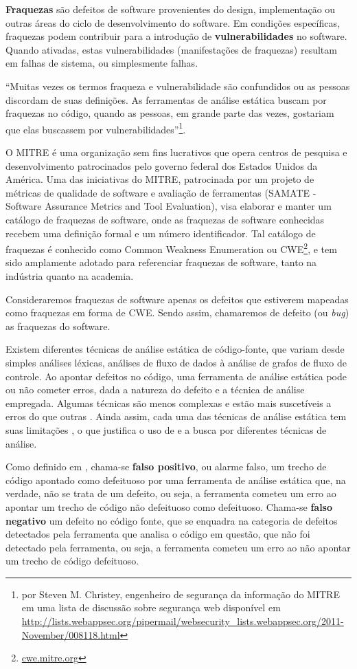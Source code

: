 \textbf{Fraquezas} são defeitos de software provenientes do design, implementação ou outras áreas do ciclo de desenvolvimento do software. Em condições específicas, fraquezas podem contribuir para a introdução de \textbf{vulnerabilidades} no software. Quando ativadas, estas vulnerabilidades (manifestações de fraquezas) resultam em falhas de sistema, ou simplesmente falhas.

``Muitas vezes os termos fraqueza e vulnerabilidade são confundidos ou as pessoas discordam de suas definições. As ferramentas de análise estática buscam por fraquezas no código, quando as pessoas, em grande parte das vezes, gostariam que elas buscassem por vulnerabilidades''\footnote{por Steven M. Christey, engenheiro de segurança da informação do MITRE em uma lista de discussão sobre segurança web disponível em \url{http://lists.webappsec.org/pipermail/websecurity_lists.webappsec.org/2011-November/008118.html}}.

O MITRE é uma organização sem fins lucrativos que opera centros de pesquisa e desenvolvimento patrocinados pelo governo federal dos Estados Unidos da América. Uma das iniciativas do MITRE, patrocinada por um projeto de métricas de qualidade de software e avaliação de ferramentas (SAMATE - Software Assurance Metrics and Tool Evaluation), visa elaborar e manter um catálogo de fraquezas de software, onde as fraquezas de software conhecidas recebem uma definição formal e um número identificador. Tal catálogo de fraquezas é conhecido como Common Weakness Enumeration ou CWE\footnote{\url{cwe.mitre.org}}, e tem sido amplamente adotado para referenciar fraquezas de software, tanto na indústria quanto na academia.

Consideraremos fraquezas de software apenas os defeitos que estiverem mapeadas como fraquezas em forma de CWE. Sendo assim, chamaremos de defeito (ou \textit{bug}) as fraquezas do software.

Existem diferentes técnicas de análise estática de código-fonte, que variam desde simples análises léxicas, análises de fluxo de dados à análise de grafos de fluxo de controle. Ao apontar defeitos no código, uma ferramenta de análise estática pode ou não cometer erros, dada a natureza do defeito e a técnica de análise empregada. Algumas técnicas são menos complexas e estão mais suscetíveis a erros do que outras \cite{harvard}. Ainda assim, cada uma das técnicas de análise estática tem suas limitações \cite{pascal}, o que justifica o uso de e a busca por diferentes técnicas de análise.

Como definido em \cite{sa_spec}, chama-se \textbf{falso positivo}, ou alarme falso, um trecho de código apontado como defeituoso por uma ferramenta de análise estática que, na verdade, não se trata de um defeito, ou seja, a ferramenta cometeu um erro ao apontar um trecho de código não defeituoso como defeituoso. Chama-se \textbf{falso negativo} um defeito no código fonte, que se enquadra na categoria de defeitos detectados pela ferramenta que analisa o código em questão, que não foi detectado pela ferramenta, ou seja, a ferramenta cometeu um erro ao não apontar um trecho de código defeituoso.

